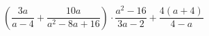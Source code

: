 \begin{ex}[type=expression]
	\begin{condition}
		 \( \left( \dfrac{3a}{a-4}+\dfrac{10a}{a^2-8a+16} \right) \cdot\dfrac{a^2-16}{3a-2}+\dfrac{4(a+4)}{4-a}\)
	\end{condition}
\end{ex}